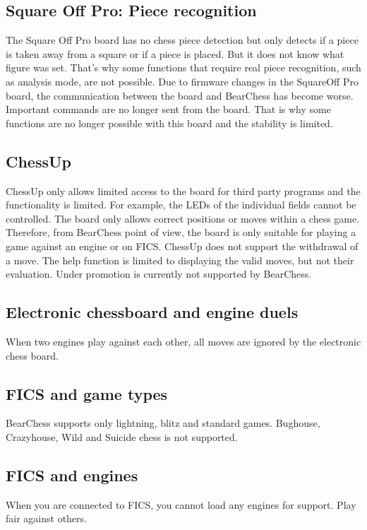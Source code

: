 \documentclass[11pt,a4paper]{article}
\begin{document}
\subsection{Square Off Pro: Piece recognition}
The Square Off Pro board has no chess piece detection but only detects if a piece is taken away from a square or if a piece is placed. But it does not know what figure was set. That's why some functions that require real piece recognition, such as analysis mode, are not possible. Due to firmware changes in the SquareOff Pro board, the communication between the board and BearChess has become worse. Important commands are no longer sent from the board.
That is why some functions are no longer possible with this board and the stability is limited.

\subsection{ChessUp}
ChessUp only allows limited access to the board for third party programs and the functionality is limited. For example, the LEDs of the individual fields cannot be controlled. The board only allows correct positions or moves within a chess game. Therefore, from BearChess point of view, the board is only suitable for playing a game against an engine or on FICS. ChessUp does not support the withdrawal of a move. The help function is limited to displaying the valid moves, but not their evaluation. Under promotion is currently not supported by BearChess.

\subsection{Electronic chessboard and engine duels}
When two engines play against each other, all moves are ignored by the electronic chess board.

\subsection{FICS and game types}
BearChess supports only lightning, blitz and standard games. Bughouse, Crazyhouse, Wild and Suicide chess is not supported.

\subsection{FICS and engines}
When you are connected to FICS, you cannot load any engines for support. Play fair against others.
\end{document}

